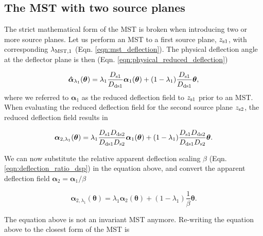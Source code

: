\documentclass[a4paper,11pt]{article}
\begin{document}
\subsection{The MST with two source planes}

The strict mathematical form of the MST is broken when introducing two or more source planes. Let us perform an MST to a first source plane, $z_{\rm s1}$, with corresponding $\lambda_{\rm MST, 1}$ (Eqn. \ref{eqn:mst_deflection}).
The physical deflection angle at the deflector plane is then (Eqn. \ref{eqn:physical_reduced_deflection})

\begin{equation}
    \boldsymbol{\hat{\alpha}}_{\lambda_{1}}(\boldsymbol{\theta}) = \lambda_{1} \frac{D_{\rm s1}}{D_{\rm ds1}} \boldsymbol{\alpha}_1(\boldsymbol{\theta}) + (1 - \lambda_{1}) \frac{D_{\rm s1}}{D_{\rm ds1}} \boldsymbol{\theta},
\end{equation}
where we referred to $\boldsymbol{\alpha}_1$ as the reduced deflection field to $z_{\rm s1}$ prior to an MST.
When evaluating the reduced deflection field for the second source plane $z_{\rm s2}$, the reduced deflection field results in

\begin{equation}
    \boldsymbol{\alpha}_{2, \lambda_1}(\boldsymbol{\theta}) = \lambda_{1} \frac{D_{\rm s1} D_{\rm ds2}}{D_{\rm ds1} D_{\rm s2}} \boldsymbol{\alpha}_1(\boldsymbol{\theta}) + (1 - \lambda_{1}) \frac{D_{\rm s1} D_{\rm ds2}}{D_{\rm ds1} D_{\rm s2}} \boldsymbol{\theta}.
\end{equation}

We can now substitute the relative apparent deflection scaling $\beta$ (Eqn. \ref{eqn:deflection_ratio_dsp}) in the equation above, and convert the apparent deflection field $\boldsymbol{\alpha}_2 = \boldsymbol{\alpha}_1 /\beta$

\begin{equation}
    \boldsymbol{\alpha}_{2, \lambda_1}(\boldsymbol{\theta}) = \lambda_{1} \boldsymbol{\alpha}_2(\boldsymbol{\theta}) + (1 - \lambda_{1}) \frac{1}{\beta} \boldsymbol{\theta}.
\end{equation}

The equation above is not an invariant MST anymore. Re-writing the equation above to the closest form of the MST is
\end{document}
